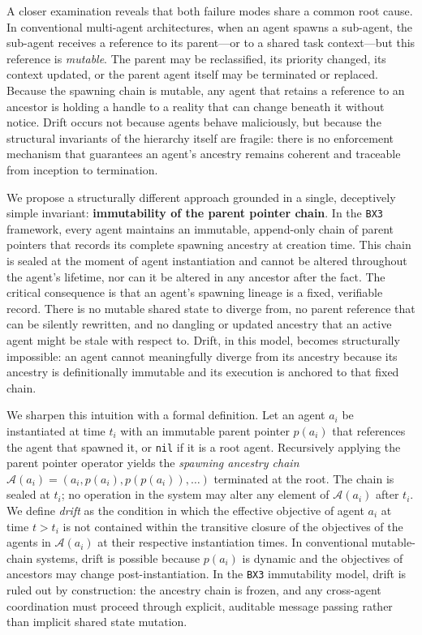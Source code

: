 A closer examination reveals that both failure modes share a common root cause. In conventional multi-agent architectures, when an agent spawns a sub-agent, the sub-agent receives a reference to its parent---or to a shared task context---but this reference is \textit{mutable}. The parent may be reclassified, its priority changed, its context updated, or the parent agent itself may be terminated or replaced. Because the spawning chain is mutable, any agent that retains a reference to an ancestor is holding a handle to a reality that can change beneath it without notice. Drift occurs not because agents behave maliciously, but because the structural invariants of the hierarchy itself are fragile: there is no enforcement mechanism that guarantees an agent's ancestry remains coherent and traceable from inception to termination.

We propose a structurally different approach grounded in a single, deceptively simple invariant: \textbf{immutability of the parent pointer chain}. In the \texttt{BX3} framework, every agent maintains an immutable, append-only chain of parent pointers that records its complete spawning ancestry at creation time. This chain is sealed at the moment of agent instantiation and cannot be altered throughout the agent's lifetime, nor can it be altered in any ancestor after the fact. The critical consequence is that an agent's spawning lineage is a fixed, verifiable record. There is no mutable shared state to diverge from, no parent reference that can be silently rewritten, and no dangling or updated ancestry that an active agent might be stale with respect to. Drift, in this model, becomes structurally impossible: an agent cannot meaningfully diverge from its ancestry because its ancestry is definitionally immutable and its execution is anchored to that fixed chain.

We sharpen this intuition with a formal definition. Let an agent $a_i$ be instantiated at time $t_i$ with an immutable parent pointer $p(a_i)$ that references the agent that spawned it, or \texttt{nil} if it is a root agent. Recursively applying the parent pointer operator yields the \textit{spawning ancestry chain} $\mathcal{A}(a_i) = (a_i, p(a_i), p(p(a_i)), \dots)$ terminated at the root. The chain is sealed at $t_i$; no operation in the system may alter any element of $\mathcal{A}(a_i)$ after $t_i$. We define \textit{drift} as the condition in which the effective objective of agent $a_i$ at time $t > t_i$ is not contained within the transitive closure of the objectives of the agents in $\mathcal{A}(a_i)$ at their respective instantiation times. In conventional mutable-chain systems, drift is possible because $p(a_i)$ is dynamic and the objectives of ancestors may change post-instantiation. In the \texttt{BX3} immutability model, drift is ruled out by construction: the ancestry chain is frozen, and any cross-agent coordination must proceed through explicit, auditable message passing rather than implicit shared state mutation.

